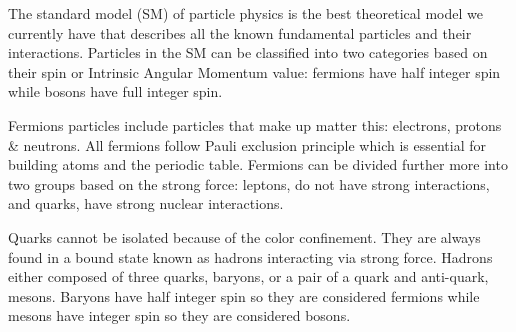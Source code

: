  

 

 




The standard model (SM) of particle physics is the best theoretical model we currently have that describes all the known fundamental particles and their interactions. Particles in the SM can be classified into two categories based on their spin or Intrinsic Angular Momentum value: fermions have half integer spin while bosons have full integer spin. 

Fermions particles include particles that make up matter this: electrons, protons & neutrons. All fermions follow Pauli exclusion principle which is essential for building atoms and the periodic table. Fermions can be divided further more into two groups based on the strong force: leptons, do not have strong interactions, and quarks, have strong nuclear interactions. 
 
Quarks cannot be isolated because of the color confinement. They are always found in a bound state known as hadrons interacting via strong force. Hadrons either composed of three quarks, baryons, or a pair of a quark and anti-quark, mesons. Baryons have half integer spin so they are considered fermions while mesons have integer spin so they are considered bosons.

